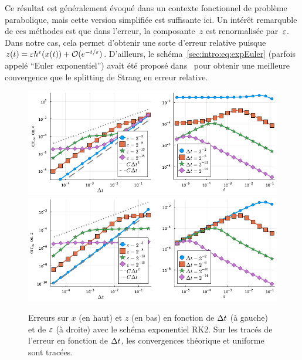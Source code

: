 \medskip%
Ce résultat est généralement évoqué dans un contexte fonctionnel de problème parabolique, mais cette version simplifiée est suffisante ici. Un intérêt remarquble de ces méthodes est que dans l'erreur, la composante~$z$ est renormalisée par~$\varepsilon$. Dans notre cas, cela permet d'obtenir une sorte d'erreur relative puisque $z(t) = \varepsilon h^{\varepsilon}(x(t)) + \mathcal{O}(e^{-t/\varepsilon})$. D'ailleurs, le schéma~\eqref{sec:intro:eq:expEuler} (parfois appelé \enquote{Euler exponentiel}) avait été proposé dans~\cite{verwer.1998.note} pour obtenir une meilleure convergence que le splitting de Strang en erreur relative. 

\begin{figure}[!h]
    \centering
    \includegraphics[width=\textwidth]{./Presentation/rk2_err_x.pdf}
    \includegraphics[width=\textwidth]{./Presentation/rk2_err_z.pdf}
    \caption{Erreurs sur $x$ (en haut) et $z$ (en bas) en fonction de $\Delta t$ (à gauche) et de $\varepsilon$ (à droite) avec le schéma exponentiel RK2. Sur les tracés de l'erreur en fonction de $\Delta t$, les convergences théorique et uniforme sont tracées.}
    \label{sec:intro:fig:rk2}
\end{figure}

